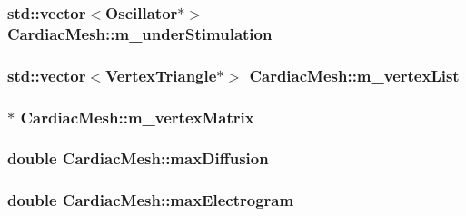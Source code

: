 \hypertarget{class_cardiac_mesh_a21749f0b4af8fe59552f97058982f695}{
\subsubsection[{m\+\_\+under\+Stimulation}]{\setlength{\rightskip}{0pt plus 5cm}std\+::vector$<${\bf Oscillator}$\ast$$>$ Cardiac\+Mesh\+::m\+\_\+under\+Stimulation}}\label{class_cardiac_mesh_a21749f0b4af8fe59552f97058982f695}
\hypertarget{class_cardiac_mesh_a1961c25aa2da5493c0316d80c38cc088}{
\subsubsection[{m\+\_\+vertex\+List}]{\setlength{\rightskip}{0pt plus 5cm}std\+::vector$<${\bf Vertex\+Triangle}$\ast$$>$ Cardiac\+Mesh\+::m\+\_\+vertex\+List}}\label{class_cardiac_mesh_a1961c25aa2da5493c0316d80c38cc088}
\hypertarget{class_cardiac_mesh_a0d622a665e0305897c133c8c4fe8733a}{
\subsubsection[{m\+\_\+vertex\+Matrix}]{$\ast$ Cardiac\+Mesh\+::m\+\_\+vertex\+Matrix}}\label{class_cardiac_mesh_a0d622a665e0305897c133c8c4fe8733a}
\hypertarget{class_cardiac_mesh_a12c5bfc555eca8ecff53e9a5977d8be4}{
\subsubsection[{max\+Diffusion}]{\setlength{\rightskip}{0pt plus 5cm}double Cardiac\+Mesh\+::max\+Diffusion}}\label{class_cardiac_mesh_a12c5bfc555eca8ecff53e9a5977d8be4}
\hypertarget{class_cardiac_mesh_a086be28c59e4edcebade42b3bdf51f01}{
\subsubsection[{max\+Electrogram}]{\setlength{\rightskip}{0pt plus 5cm}double Cardiac\+Mesh\+::max\+Electrogram}}\label{class_cardiac_mesh_a086be28c59e4edcebade42b3bdf51f01}
